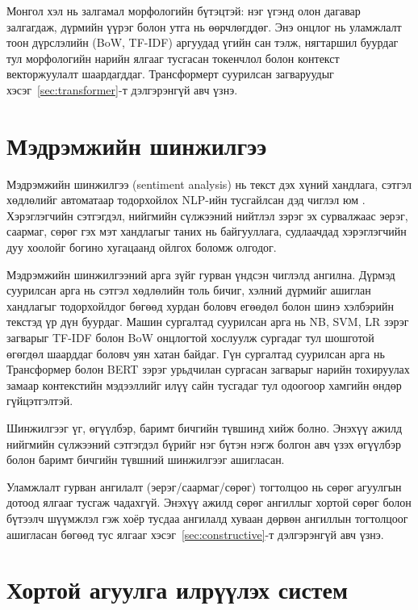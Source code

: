 Монгол хэл нь залгамал морфологийн бүтэцтэй: нэг үгэнд олон дагавар
залгагдаж, дүрмийн үүрэг болон утга нь өөрчлөгддөг. Энэ онцлог нь
уламжлалт тоон дүрслэлийн (BoW, TF-IDF) аргуудад үгийн сан тэлж,
нягтаршил буурдаг тул морфологийн нарийн ялгааг тусгасан токенчлол болон
контекст векторжуулалт шаардагддаг. Трансформерт суурилсан загваруудыг
хэсэг~\ref{sec:transformer}-т дэлгэрэнгүй авч үзнэ.

\section{Мэдрэмжийн шинжилгээ}
\label{sec:sentiment-analysis}

Мэдрэмжийн шинжилгээ (sentiment analysis) нь текст дэх хүний хандлага,
сэтгэл хөдлөлийг автоматаар тодорхойлох NLP-ийн тусгайлсан дэд чиглэл
юм \cite{liu2012}. Хэрэглэгчийн сэтгэгдэл, нийгмийн сүлжээний нийтлэл
зэрэг эх сурвалжаас эерэг, саармаг, сөрөг гэх мэт хандлагыг таних нь
байгууллага, судлаачдад хэрэглэгчийн дуу хоолойг богино хугацаанд
ойлгох боломж олгодог.

Мэдрэмжийн шинжилгээний арга зүйг гурван үндсэн чиглэлд ангилна. Дүрмэд
суурилсан арга нь сэтгэл хөдлөлийн толь бичиг, хэлний дүрмийг ашиглан
хандлагыг тодорхойлдог бөгөөд хурдан боловч егөөдөл болон шинэ хэлбэрийн
текстэд үр дүн буурдаг. Машин сургалтад суурилсан арга нь NB, SVM, LR зэрэг
загварыг TF-IDF болон BoW онцлогтой хослуулж сургадаг тул шошготой өгөгдөл
шаарддаг боловч уян хатан байдаг. Гүн сургалтад суурилсан арга нь Трансформер
болон BERT зэрэг урьдчилан сургасан загварыг нарийн тохируулах замаар
контекстийн мэдээллийг илүү сайн тусгадаг тул одоогоор хамгийн өндөр
гүйцэтгэлтэй.

Шинжилгээг үг, өгүүлбэр, баримт бичгийн түвшинд хийж болно. Энэхүү ажилд
нийгмийн сүлжээний сэтгэгдэл бүрийг нэг
бүтэн нэгж болгон авч үзэх өгүүлбэр болон баримт бичгийн түвшний
шинжилгээг ашигласан.

Уламжлалт гурван ангилалт (эерэг/саармаг/сөрөг) тогтолцоо нь сөрөг
агуулгын дотоод ялгааг тусгаж чадахгүй. Энэхүү ажилд сөрөг ангиллыг
хортой сөрөг болон бүтээлч шүүмжлэл гэж хоёр тусдаа ангилалд хуваан
дөрвөн ангиллын тогтолцоог ашигласан бөгөөд тус ялгааг
хэсэг~\ref{sec:constructive}-т дэлгэрэнгүй авч үзнэ.

\section{Хортой агуулга илрүүлэх систем}

